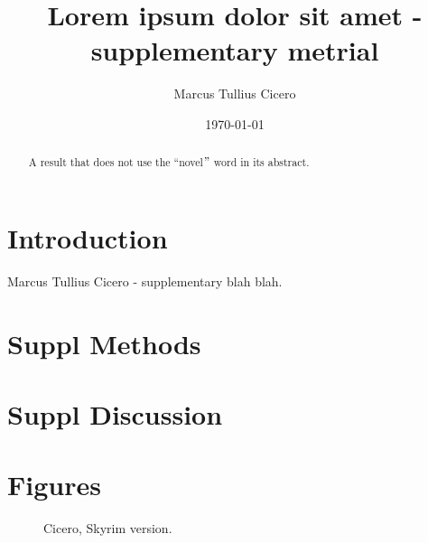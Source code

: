 \documentclass[fleqn]{scrartcl}%
\title{Lorem ipsum dolor sit amet - supplementary metrial}%
\author{Marcus Tullius Cicero}%
\date{\today}%
\begin{document}
    \maketitle
    \begin{abstract}
        A result that does not use the ``novel\("\) word in its abstract.
    \end{abstract}


    \clearpage
    \section*{Introduction}
    Marcus Tullius Cicero  - supplementary blah blah.

    \clearpage
    \section*{Suppl Methods}
    \blindtext




    \clearpage
    \section*{Suppl Discussion}
    \blindtext


    \clearpage
    


    \clearpage
    \section*{Figures}

    \begin{figure}[ht]%
        \caption {Cicero, Skyrim version.}
        \label{fig:ciceroskyrim} %
    \end{figure}
\end{document}

